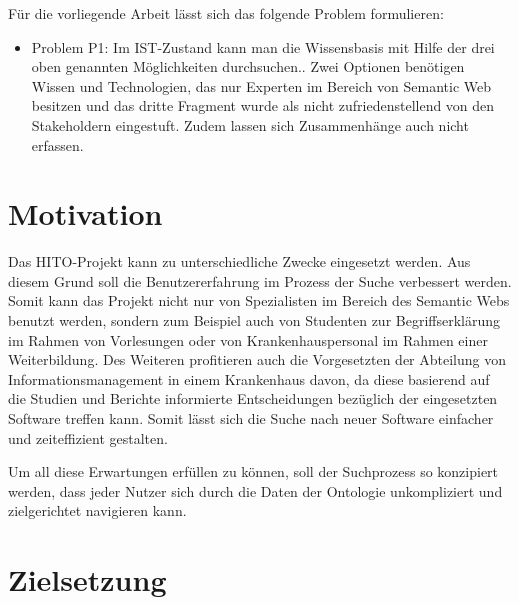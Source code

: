 
Für die vorliegende Arbeit lässt sich das folgende Problem formulieren:

\begin{itemize}
\item Problem P1: Im IST-Zustand kann man die Wissensbasis mit Hilfe der drei oben genannten Möglichkeiten durchsuchen.. 
Zwei Optionen benötigen Wissen und Technologien, das nur Experten im Bereich von Semantic Web besitzen und das dritte Fragment wurde als nicht zufriedenstellend von den Stakeholdern eingestuft.
Zudem lassen sich Zusammenhänge auch nicht erfassen.
\end{itemize}

\section{Motivation}\label{sec:motivation}

Das HITO-Projekt kann zu unterschiedliche Zwecke eingesetzt werden. Aus diesem Grund soll die Benutzererfahrung im Prozess der Suche verbessert werden. Somit kann das Projekt nicht nur von Spezialisten im Bereich des Semantic Webs benutzt werden, sondern zum Beispiel auch von Studenten zur Begriffserklärung im Rahmen von Vorlesungen oder von Krankenhauspersonal im Rahmen einer Weiterbildung. Des Weiteren profitieren auch die Vorgesetzten der Abteilung von Informationsmanagement in einem Krankenhaus davon, da diese basierend auf die Studien und Berichte informierte Entscheidungen bezüglich der eingesetzten Software treffen kann. Somit lässt sich die Suche nach neuer Software einfacher und zeiteffizient gestalten.

Um all diese Erwartungen erfüllen zu können, soll der Suchprozess so konzipiert werden, dass jeder Nutzer sich durch die Daten der Ontologie unkompliziert und zielgerichtet navigieren kann.

\section{Zielsetzung}\label{sec:zielsetzung}


